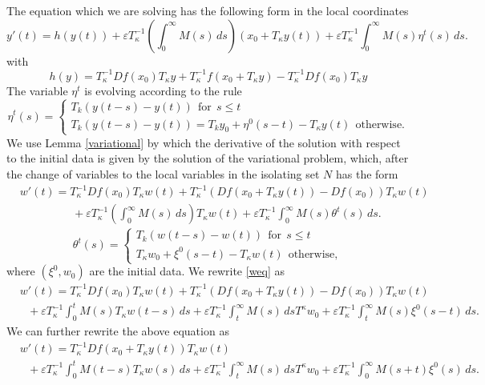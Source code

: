 \documentclass[11pt, leqno]{amsart}
\theoremstyle{definition}
\begin{document}
The equation which we are solving has the following form in the local coordinates
$$
y'(t) = h(y(t)) + \varepsilon T_{\kappa}^{-1} \left(\int_0^\infty M(s)\, ds\right) (x_0+T_\kappa y(t)) + \varepsilon T_\kappa^{-1}\int_0^\infty M(s) \eta^t(s)\, ds.
$$
with
$$
h(y) = T_\kappa^{-1}D f(x_0) T_\kappa y + T_\kappa^{-1} f(x_0 + T_\kappa y) - T_\kappa^{-1}D f(x_0) T_\kappa y
$$
The variable $\eta^t$ is evolving according to the rule
$$
\eta^t(s) = \begin{cases} T_k(y(t-s) - y(t))\ \ \textrm{for}\ \ s\leq t\\
	T_k(y(t-s) - y(t))=T_k y_0 +\eta^0(s-t) - T_\kappa y(t)\ \ \textrm{otherwise}.
\end{cases}
$$
We use Lemma \ref{variational} by which  the derivative of the solution with respect to the initial data is given by the solution of the variational problem, which, after the change of variables to the local variables in the isolating set $N$ has the form
\begin{align}
	& w'(t) = T_\kappa^{-1}D f(x_0) T_\kappa w(t) + T_\kappa^{-1} (Df(x_0 + T_\kappa y(t)) - D f(x_0)) T_\kappa w(t) \nonumber\\
	& \ \ \ \qquad \qquad + \varepsilon T_{\kappa}^{-1} \left(\int_0^\infty M(s)\, ds\right) T_\kappa w(t) + \varepsilon T_\kappa^{-1}\int_0^\infty M(s) \theta^t(s)\, ds.\label{weq}
\end{align}
$$
\theta^t(s) = \begin{cases} T_k(w(t-s) - w(t))\ \ \textrm{for}\ \ s\leq t\\
	T_\kappa w_0+\xi^0(s-t) - T_\kappa w(t)\ \ \textrm{otherwise},
\end{cases}
$$
where $(\xi^0,w_0)$ are the initial data.
 We rewrite \eqref{weq} as
\begin{align}
	& w'(t) = T_\kappa^{-1}D f(x_0) T_\kappa w(t) + T_\kappa^{-1} (Df(x_0 + T_\kappa y(t)) - D f(x_0)) T_\kappa w(t) \nonumber\\
	& \ \ \  + \varepsilon T_\kappa^{-1}\int_0^t M(s) T_\kappa w(t-s)\, ds  + \varepsilon T_\kappa^{-1}\int_t^\infty M(s) \, dsT^\kappa w_0 + \varepsilon T_\kappa^{-1}\int_t^\infty M(s) \xi^0(s-t)\, ds.\label{eqw1}
\end{align}
We can further rewrite the above equation as
\begin{align}
	& w'(t) =  T_\kappa^{-1} Df(x_0 + T_\kappa y(t))  T_\kappa w(t) \nonumber\\
	& \ \ \  + \varepsilon T_\kappa^{-1}\int_0^t M(t-s) T_\kappa w(s)\, ds  + \varepsilon T_\kappa^{-1}\int_t^\infty M(s) \, dsT^\kappa w_0 + \varepsilon T_\kappa^{-1}\int_0^\infty M(s+t) \xi^0(s)\, ds. \label{106}
\end{align}
\end{document}
